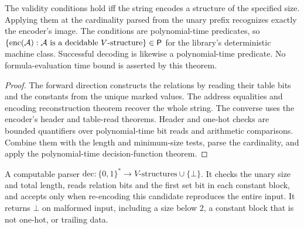 \begin{theorem}
  \label{thm:desc-valid-encodings-P}
  \leanok
  The validity conditions hold iff the string encodes a structure of the
  specified size. Applying them at the cardinality parsed from the unary
  prefix recognizes exactly the encoder's image. The conditions are
  polynomial-time predicates, so
  $\{\mathrm{enc}(\mathcal A):\mathcal A\text{ is a decidable }V\text{-structure}\}
  \in\mathsf{P}$ for the library's deterministic machine class. Successful decoding
  is likewise a polynomial-time predicate. No formula-evaluation time bound
  is asserted by this theorem.
\end{theorem}
\begin{proof}
  \leanok
  The forward direction constructs the relations by reading their table bits
  and the constants from the unique marked values. The address equalities and
  encoding reconstruction theorem recover the whole string. The converse uses
  the encoder's header and table-read theorems. Header and one-hot checks are
  bounded quantifiers over polynomial-time bit reads and arithmetic comparisons.
  Combine them with the length and minimum-size tests, parse the cardinality,
  and apply the polynomial-time decision-function theorem.
\end{proof}

\begin{definition}
  \label{def:desc-decoder}
  \leanok
  A computable parser $\mathrm{dec} : \{0,1\}^* \to V\text{-structures} \cup \{\bot\}$.
  It checks the unary size and total length, reads relation bits and the first
  set bit in each constant block, and accepts only when re-encoding this candidate
  reproduces the entire input. It returns $\bot$ on malformed input, including
  a size below $2$, a constant block that is not one-hot, or trailing data.
\end{definition}

